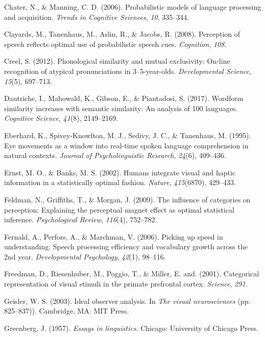 \documentclass[english,man]{apa6}
\theoremstyle{definition}
\theoremstyle{definition}
\theoremstyle{definition}
\theoremstyle{remark}
\begin{document}
\hypertarget{ref-chater06}{}
Chater, N., \& Manning, C. D. (2006). Probabilistic models of language
processing and acquisition. \emph{Trends in Cognitive Sciences},
\emph{10}, 335--344.

\hypertarget{ref-clayard08}{}
Clayards, M., Tanenhaus, M., Aslin, R., \& Jacobs, R. (2008). Perception
of speech reflects optimal use of probabilistic speech cues.
\emph{Cognition}, \emph{108}.

\hypertarget{ref-Creel2012}{}
Creel, S. (2012). Phonological similarity and mutual exclusivity:
On-line recognition of atypical pronunciations in 3--5-year-olds.
\emph{Developmental Science}, \emph{15}(5), 697--713.

\hypertarget{ref-dautriche17}{}
Dautriche, I., Mahowald, K., Gibson, E., \& Piantadosi, S. (2017).
Wordform similarity increases with semantic similarity: An analysis of
100 languages. \emph{Cognitive Science}, \emph{41}(8), 2149--2169.

\hypertarget{ref-Eberhard1995}{}
Eberhard, K., Spivey-Knowlton, M. J., Sedivy, J. C., \& Tanenhaus, M.
(1995). Eye movements as a window into real-time spoken language
comprehension in natural contexts. \emph{Journal of Psycholinguistic
Research}, \emph{24}(6), 409--436.

\hypertarget{ref-ernst02}{}
Ernst, M. O., \& Banks, M. S. (2002). Humans integrate visual and haptic
information in a statistically optimal fashion. \emph{Nature},
\emph{415}(6870), 429--433.

\hypertarget{ref-feldman2009}{}
Feldman, N., Griffiths, T., \& Morgan, J. (2009). The influence of
categories on perception: Explaining the perceptual magnet effect as
optimal statistical inference. \emph{Psychological Review},
\emph{116}(4), 752--782.

\hypertarget{ref-fernald2006}{}
Fernald, A., Perfors, A., \& Marchman, V. (2006). Picking up speed in
understanding: Speech processing efficiency and vocabulary growth across
the 2nd year. \emph{Developmental Psychology}, \emph{42}(1), 98--116.

\hypertarget{ref-freedman2001}{}
Freedman, D., Riesenhuber, M., Poggio, T., \& Miller, E. and. (2001).
Categorical representation of visual stimuli in the primate prefrontal
cortex. \emph{Science}, \emph{291}.

\hypertarget{ref-Geisler2003}{}
Geisler, W. S. (2003). Ideal observer analysis. In \emph{The visual
neurosciences} (pp. 825--837)). Cambridge, MA: MIT Press.

\hypertarget{ref-greenberg1957}{}
Greenberg, J. (1957). \emph{Essays in linguistics}. Chicago: University
of Chicago Press.
\end{document}
